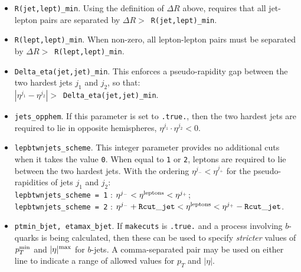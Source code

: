\documentclass{article}
\begin{document}
\begin{itemize}
\item {\tt R(jet,lept)\_min}. Using the definition of $\Delta R$ above,
requires that all jet-lepton pairs are separated by
$\Delta R >$~{\tt R(jet,lept)\_min}.

\item {\tt R(lept,lept)\_min}. When non-zero, all lepton-lepton pairs
must be separated by $\Delta R >$~{\tt R(lept,lept)\_min}.

\item {\tt Delta\_eta(jet,jet)\_min}. This enforces a pseudo-rapidity
gap between the two hardest jets $j_1$ and $j_2$, so that: \\
$|\eta^{j_1} - \eta^{j_2}| >$~{\tt Delta\_eta(jet,jet)\_min}.

\item {\tt jets\_opphem}. If this parameter is set to {\tt .true.},
then the two hardest jets are required to lie in opposite hemispheres,
$\eta^{j_1} \cdot \eta^{j_2} < 0$.

\item {\tt lepbtwnjets\_scheme}. This integer parameter provides no
additional cuts when it takes the value {\tt 0}. When equal to
{\tt 1} or {\tt 2}, leptons are required to lie between the two
hardest jets. With the ordering $\eta^{j_-} < \eta^{j_+}$ for the
pseudo-rapidities of jets $j_1$ and $j_2$: \\
{\tt lepbtwnjets\_scheme = 1} : 
 $\eta^{j_-} < \eta^{\rm leptons} < \eta^{j_+}$; \\
{\tt lepbtwnjets\_scheme = 2} :
 $\eta^{j_-}+{\tt Rcut\_jet} < \eta^{\rm leptons} < \eta^{j_+}-{\tt Rcut\_jet}$.

\item {\tt ptmin\_bjet,  etamax\_bjet}. If {\tt makecuts} is {\tt .true.}
and a process involving $b$-quarks is being calculated, then these can
be used to specify {\em stricter} values of $p_T^{\rm min}$
and $|\eta|^{\rm max}$ for $b$-jets.   A comma-separated pair
may be used on either line to indicate a range of allowed values for
$p_T$ and $|\eta|$.


\end{itemize}
\end{document}
